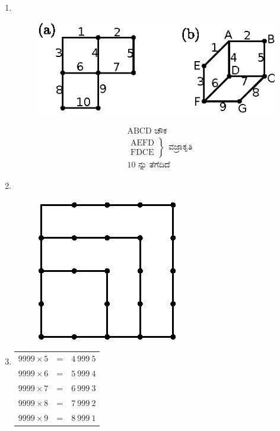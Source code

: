 \begin{enumerate}
\item
~

\begin{minipage}[c]{5cm}
\begin{figure}[H]
\centering
\includegraphics[scale=1.2]{images/chap5/ans11.eps}
\end{figure}
\end{minipage}
\qquad\qquad
\begin{minipage}[c]{4cm}
\begin{align*}
& \text{ABCD  ಚೌಕ }\\
& \left.
\begin{aligned}
\text{AEFD} \\
\text{FDCE}
\end{aligned}
\right\}
~~  \text{ವಜ್ರಾಕೃತಿ}\\
& 10 \text{ ನ್ನು ತೆಗೆದಿದೆ }
\end{align*}
\end{minipage}

\eject

\item
~
\vskip -0.8cm
\begin{figure}[H]
\centering
\includegraphics{images/chap5/ans12.eps}
\end{figure}

\item
\begin{tabular}[t]{lll}
$9999 \times 5$ & = & $4~999~5$\\
$9999 \times 6$ & = & $5~999~4$\\
$9999 \times 7$ & = & $6~999~3$\\
$9999 \times 8$ & = & $7~999~2$\\
$9999 \times 9$ & = & $8~999~1$
\end{tabular}


\end{enumerate}
